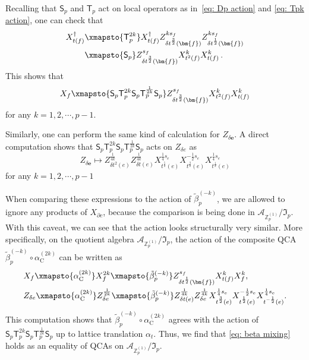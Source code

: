 \documentclass[aps,twocolumn,prx,floatfix,preprintnumbers, nofootinbib,10pt]{revtex4-2}
\numberwithin{equation}{section}
\theoremstyle{definition}
\theoremstyle{remark}
\theoremstyle{claim}
\newcommand{\be}{\begin{equation}}
\newcommand{\ee}{\end{equation}}
\newcommand{\Z}{{\mathbb Z}}
\newcommand{\mc}[1]{\mathcal{#1}}
\renewcommand{\sf}[1]{\mathsf{#1}}
\begin{document}
Recalling that $\mathsf{S}_p$ and $\sf{T}_p$ act on local operators as in~\eqref{eq: Dp action} and \eqref{eq: Tpk action}, one can check that
\begin{equation}
\begin{aligned}
X_{t(f)}^\dag
&\xmapsto{\sf{T}_p^{2k}} X_{t(f)}^\dag Z_{\delta t^{\frac{3}{2}}(\bm{f})}^{ k s_f} Z_{\delta t^{\frac{1}{2}}(\bm{f})}^{ k s_f} \\
&\xmapsto{\sf{S}_p} Z_{\delta t^{\frac{3}{2}}(\bm{f})}^{s_f} X_{t^2(f)}^{k} X_{t(f)}^{k} \,.
\end{aligned}
\label{eq: DTDTD X}
\end{equation}
This shows that
\begin{equation}
 X_f \xmapsto{\mathsf{S}_p \sf{T}_p^{2k} \mathsf{S}_p \sf{T}_p^{\frac{1}{2k}} \mathsf{S}_p} Z_{\delta t^{\frac{3}{2}}(\bm{f})}^{s_f} X_{t^2(f)}^{k} X_{t(f)}^{k}
\end{equation}
for any $k = 1, 2, \cdots, p-1$.

Similarly, one can perform the same kind of calculation for $Z_{\delta \bm{e}}$.
A direct computation shows that $\mathsf{S}_p\mathsf{T}_p^{2k}\mathsf{S}_p\mathsf{T}_p^{\frac{1}{2k}}\mathsf{S}_p$ acts on $Z_{\delta e}$ as
\be
Z_{\delta \bm{e}} \mapsto Z_{\delta t^2(e)}^{\frac{1}{4k}} Z_{\delta t(e)}^{\frac{1}{4k}}X_{t^{\frac{5}{2}}(e)}^{\frac{1}{4}s_e} X_{t^{\frac{3}{2}}(e)}^{-\frac{1}{2}s_e} X_{t^{\frac{1}{2}}(e)}^{\frac{1}{4}s_e}
\ee
for any $k = 1, 2, \cdots, p-1$

When comparing these expressions to the action of $\tilde{\beta}_p^{(-k)}$, we are allowed to ignore any products of $X_{\partial c}$, because the comparison is being done in $\mc{A}_{\Z_p^{(1)}} / \mathfrak{I}_p$. With this caveat, we can see that the action looks structurally very similar.
More specifically, on the quotient algebra $\mc{A}_{\Z_p^{(1)}} / \mathfrak{I}_p$, the action of the composite QCA $\tilde{\beta}_p^{(-k)} \circ \alpha_{\text{C}}^{(2k)}$ can be written as
\begin{equation}
\begin{aligned}
&X_f \xmapsto{\alpha_{\text{C}}^{(2k)}} X_f^{2k} \xmapsto{\tilde{\beta}_p^{(-k)}} Z_{\delta t^{\frac{1}{2}}(\bm{f})}^{s_f} X_{t(f)}^{k} X_{f}^{k}, \\
&Z_{\delta e} \xmapsto{\alpha_{\text{C}}^{(2k)}} Z_{\delta e}^{\frac{1}{2k}} \xmapsto{\tilde{\beta}_p^{(-k)}} Z_{\delta t(e)}^{\frac{1}{4k}} Z_{\delta e}^{\frac{1}{4k}}X_{t^{\frac{3}{2}}(e)}^{\frac{1}{4}s_e} X_{t^{\frac{1}{2}}(e)}^{-\frac{1}{2}s_e} X_{t^{-\frac{1}{2}}(e)}^{\frac{1}{4}s_e}.
\end{aligned}
\label{eq: beta alpha}
\end{equation}
This computation shows that $\tilde{\beta}_p^{(-k)} \circ \alpha_{\text{C}}^{(2k)}$ agrees with the action of $\mathsf{S}_p \sf{T}_p^{2k} \mathsf{S}_p \sf{T}_p^{\frac{1}{2k}} \mathsf{S}_p$ up to lattice translation $\alpha_t$.
Thus, we find that \eqref{eq: beta mixing} holds as an equality of QCAs on $\mathcal{A}_{\mathbb{Z}_p^{(1)}}/\mathfrak{I}_p$.
\end{document}
